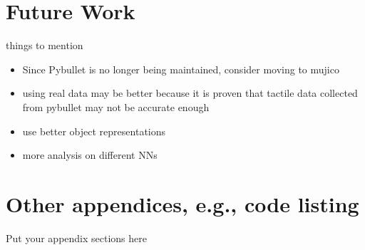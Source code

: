 \documentclass[11pt, a4paper]{report}
\begin{document}
\chapter{Future Work}
\label{chap:6}
things to mention
\begin{itemize}
    \item Since Pybullet is no longer being maintained, consider moving to mujico
    \item using real data may be better because it is proven that tactile data collected from pybullet may not be accurate enough
    \item use better object representations
    \item more analysis on different NNs
\end{itemize}




\appendix
\printbibliography

\chapter{Other appendices, e.g., code listing}
Put your appendix sections here
\end{document}
